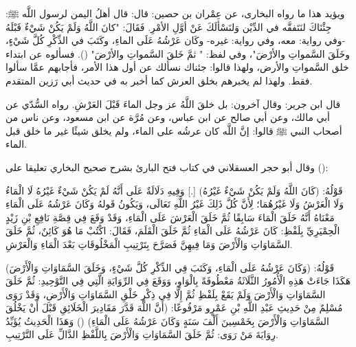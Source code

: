ويؤيد هذا ما رواه البخارى، عن عِمْران بن حصين: قال: قال أهلُ اليمن لرسول اللَّه ﷺ: جِئْنَاكَ لنَتَفقَّه في الدِّيْن وَلنَسْألَكَ عَنْ أوَّلِ الأمْرِ. فَقَالَ: "كانَ اللَّهُ وَلَمْ يَكُنْ شَيْءٌ قَبْلَهُ -وفي رواية: معه، وفي رواية: غيره- وكَان عَرْشُهُ عَلَى الماءِ، وكَتَبَ في الذِّكْرِ كُلَّ شَيْءٍ، وخَلَقَ السَّمواتِ والأرْضَ"، وفي لفظ: " ثمَّ خَلقَ السَّمواتِ والأرْضَ" (). فسألوه عن ابتداء خلق السَّمواتِ والأرض، ولهذا قالوا: جئناك نسألك عن أول هذا الأمر، فأجابهم عمَّا سألوا فقط. ولهذا لم يخبرهم بخلق العرش كما أخبر به في حديث أبي رَزين المتقدم.

قال ابن جرير: وقال آخرون: بل خلقَ اللَّهُ عز وجل الماءَ قَبْلَ العَرْشِ. رواه السُّدّي عن أبي مالك، وعن أبي صالح عن ابن عباس، وعن مُرَّة عن ابن مسعود، وعن ناس من أصحاب النبي ﷺ قالوا: إنَّ اللَّه كان عرشُه على الماء، ولم يخلق شيئًا غير ما خلق قبل الماء.

وقال أبو حجر العسقلاني في كتاب فتح البارئ بشرح صحيح البخاري \href{https://shamela.ws/book/1673/3483#p2}{\faExternalLink} تعليقا على (): 

قَوْلُهُ: (كَانَ اللَّهُ وَلَمْ يَكُنْ شَيْءٌ غَيْرُهُ) [.] وَفِيهِ دَلَالَةٌ عَلَى أَنَّهُ لَمْ يَكُنْ شَيْءٌ غَيْرُهُ لَا الْمَاءُ وَلَا الْعَرْشُ وَلَا غَيْرُهُمَا؛ لِأَنَّ كُلَّ ذَلِكَ غَيْرُ اللَّهِ تَعَالَى، وَيَكُونُ قَولهُ وَكَانَ عَرْشُهُ عَلَى الْمَاءِ مَعْنَاهُ أَنَّهُ خَلَقَ الْمَاءَ سَابِقًا ثُمَّ خَلَقَ الْعَرْشَ عَلَى الْمَاءِ، وَقَدْ وَقَعَ فِي قِصَّةِ نَافِعِ بْنِ زَيْدٍ الْحِمْيَرِيِّ بِلَفْظِ: كَانَ عَرْشُهُ عَلَى الْمَاءِ ثُمَّ خَلَقَ الْقَلَمَ، فَقَالَ: اكْتُبْ مَا هُوَ كَائِنٌ، ثُمَّ خَلَقَ السَّمَاوَاتِ وَالْأَرْضَ وَمَا فِيهِنَّ فَصَرَّحَ بِتَرْتِيبِ الْمَخْلُوقَاتِ بَعْدَ الْمَاءِ وَالْعَرْشِ.

قَوْلُهُ: (وَكَانَ عَرْشُهُ عَلَى الْمَاءِ، وَكَتَبَ فِي الذِّكْرِ كُلَّ شَيْءٍ، وَخَلَقَ السَّمَاوَاتِ وَالْأَرْضَ) هَكَذَا جَاءَتْ هَذِهِ الْأُمُورُ الثَّلَاثَةُ مَعْطُوفَةً بِالْوَاوِ، وَوَقَعَ فِي الرِّوَايَةِ الَّتِي فِي التَّوْحِيدِ: ثُمَّ خَلَقَ السَّمَاوَاتِ وَالْأَرْضَ وَلَمْ يَقَعْ بِلَفْظِ ثُمَّ إِلَّا فِي ذِكْرِ خَلْقِ السَّمَاوَاتِ وَالْأَرْضِ، وَقَدْ رَوَى مُسْلِمٌ مِنْ حَدِيثِ عَبْدِ اللَّهِ بْنِ عَمْرٍو مَرْفُوعًا: (أَنَّ اللَّهَ قَدَّرَ مَقَادِيرَ الْخَلَائِقِ قَبْلَ أَنْ يَخْلُقَ السَّمَاوَاتِ وَالْأَرْضَ بِخَمْسِينَ أَلْفَ سَنَةٍ وَكَانَ عَرْشُهُ عَلَى الْمَاءِ) () وَهَذَا الْحَدِيثُ يُؤَيِّدُ رِوَايَةَ مَنْ رَوَى: ثُمَّ خَلَقَ السَّمَاوَاتِ وَالْأَرْضَ بِاللَّفْظِ الدَّالِّ عَلَى التَّرْتِيبِ.

